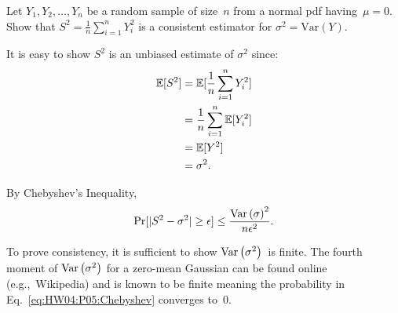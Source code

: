 \begin{problem}
   Let ${Y_1,Y_2,\ldots,Y_n}$ be a random sample of size~$n$ from a normal pdf having~${\mu = 0}$.  Show that ${S^2 = \frac{1}{n} \sum_{i=1}^{n} Y_{i}^2}$ is a consistent estimator for ${\sigma^{2} = \text{Var}(Y)}$.
\end{problem}

It is easy to show $S^2$ is an unbiased estimate of $\sigma^2$ since:
\begin{align}
  \mathbb{E}\lbrack S^2\rbrack &= \mathbb{E}\lbrack\frac{1}{n} \sum_{i=1}^{n} Y_{i}^{2}\rbrack \\
               &= \frac{1}{n} \sum_{i=1}^{n} \mathbb{E}\lbrack Y_{i}^{2}\rbrack \\
               &= \mathbb{E}\lbrack Y^2\rbrack \\
               &= \sigma^{2} \text{.}
\end{align}

By Chebyshev's Inequality,
\begin{equation}\label{eq:HW04:P05:Chebyshev}
  \Pr\lbrack\lvert S^2 - \sigma^2\rvert \geq \epsilon\rbrack \leq \frac{\text{Var}\left(\sigma\right)^2}{n\epsilon^2}\text{.}
\end{equation}

To prove consistency, it is sufficient to show $\text{Var}\left(\sigma^2\right)$~is finite. The fourth moment of $\text{Var}\left(\sigma^2\right)$ for a zero-mean Gaussian can be found online (e.g.,~Wikipedia) and is known to be finite meaning the probability in Eq.~\eqref{eq:HW04:P05:Chebyshev} converges to~0.
